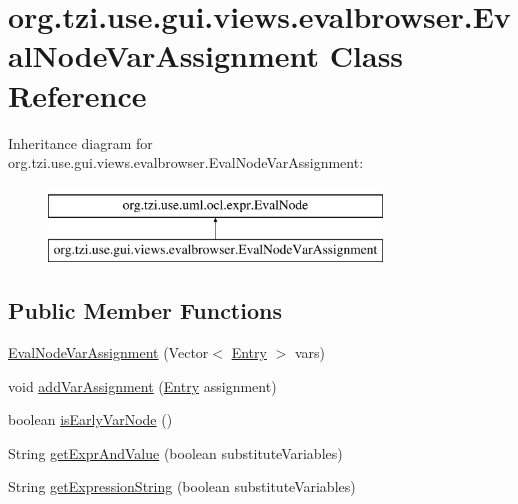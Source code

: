 \hypertarget{classorg_1_1tzi_1_1use_1_1gui_1_1views_1_1evalbrowser_1_1_eval_node_var_assignment}{\section{org.\-tzi.\-use.\-gui.\-views.\-evalbrowser.\-Eval\-Node\-Var\-Assignment Class Reference}
\label{classorg_1_1tzi_1_1use_1_1gui_1_1views_1_1evalbrowser_1_1_eval_node_var_assignment}
}
Inheritance diagram for org.\-tzi.\-use.\-gui.\-views.\-evalbrowser.\-Eval\-Node\-Var\-Assignment\-:\begin{figure}[H]
\begin{center}
\leavevmode
\includegraphics[height=2.000000cm]{classorg_1_1tzi_1_1use_1_1gui_1_1views_1_1evalbrowser_1_1_eval_node_var_assignment}
\end{center}
\end{figure}
\subsection*{Public Member Functions}
\begin{DoxyCompactItemize}
\item 
\hyperlink{classorg_1_1tzi_1_1use_1_1gui_1_1views_1_1evalbrowser_1_1_eval_node_var_assignment_acec6433cc343eadc1a203ca767eca0fa}{Eval\-Node\-Var\-Assignment} (Vector$<$ \hyperlink{classorg_1_1tzi_1_1use_1_1uml_1_1ocl_1_1value_1_1_var_bindings_1_1_entry}{Entry} $>$ vars)
\item 
void \hyperlink{classorg_1_1tzi_1_1use_1_1gui_1_1views_1_1evalbrowser_1_1_eval_node_var_assignment_adcabc68ee05dd6eb991ef4fd4a4fedce}{add\-Var\-Assignment} (\hyperlink{classorg_1_1tzi_1_1use_1_1uml_1_1ocl_1_1value_1_1_var_bindings_1_1_entry}{Entry} assignment)
\item 
boolean \hyperlink{classorg_1_1tzi_1_1use_1_1gui_1_1views_1_1evalbrowser_1_1_eval_node_var_assignment_ad7e0a6d32f76363e5d7cf701d129a327}{is\-Early\-Var\-Node} ()
\item 
String \hyperlink{classorg_1_1tzi_1_1use_1_1gui_1_1views_1_1evalbrowser_1_1_eval_node_var_assignment_a3c47f671bf38c81b42c8884e5044cae9}{get\-Expr\-And\-Value} (boolean substitute\-Variables)
\item 
String \hyperlink{classorg_1_1tzi_1_1use_1_1gui_1_1views_1_1evalbrowser_1_1_eval_node_var_assignment_a651f968437a76abdb6f6214187553a2d}{get\-Expression\-String} (boolean substitute\-Variables)
\end{DoxyCompactItemize}
